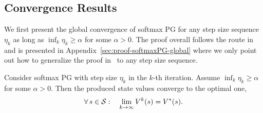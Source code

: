 \subsection{Convergence Results}
We first present the global convergence of softmax PG for any step size sequence $\eta_k$ as long as $\inf_k\eta_k\geq \alpha$ for some $\alpha>0$. The proof overall follows the route in~\cite{Agarwal_Kakade_Lee_Mahajan_2019} and is presented in Appendix~\ref{sec:proof-softmaxPG-global} where we only point out how to generalize the proof in~\cite{Agarwal_Kakade_Lee_Mahajan_2019} to any step size sequence.
\begin{theorem}\label{thm:softmaxPG-global}
    Consider softmax PG with step size $\eta_k$ in the $k$-th iteration. Assume $\inf_k\eta_k\geq \alpha$ for some $\alpha>0$. Then the produced state values  converge to the optimal one,
    \begin{align*}
        \forall \, s\in{\cal S}: \quad \lim_{k\rightarrow\infty}V^k(s) = V^*(s).
    \end{align*}
\end{theorem}

